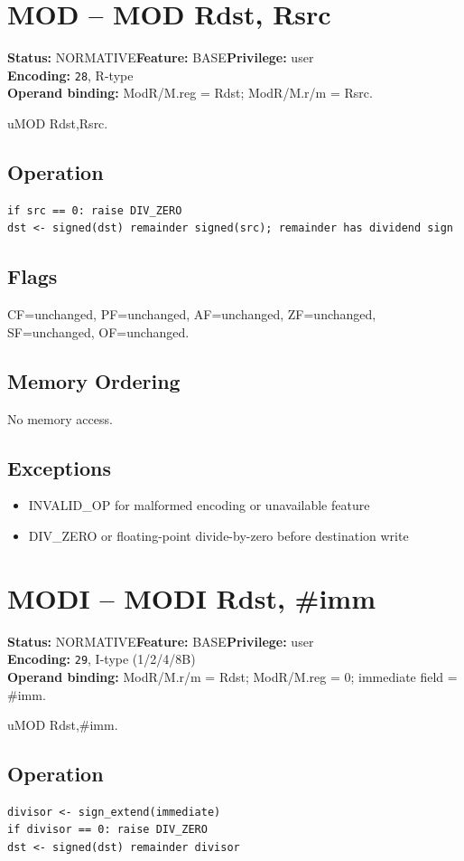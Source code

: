 \documentclass[10pt]{article}
\begin{document}
\section{MOD -- MOD Rdst, Rsrc}
\textbf{Status:} NORMATIVE\quad \textbf{Feature:} BASE\quad \textbf{Privilege:} user\\
\textbf{Encoding:} \texttt{28}, R-type\\
\textbf{Operand binding:} ModR/M.reg = Rdst; ModR/M.r/m = Rsrc.

uMOD Rdst,Rsrc.

\subsection*{Operation}
\begin{lstlisting}
if src == 0: raise DIV_ZERO
dst <- signed(dst) remainder signed(src); remainder has dividend sign
\end{lstlisting}
\subsection*{Flags}
CF=unchanged, PF=unchanged, AF=unchanged, ZF=unchanged, SF=unchanged, OF=unchanged.
\subsection*{Memory Ordering}
No memory access.
\subsection*{Exceptions}
\begin{itemize}
\item INVALID\_OP for malformed encoding or unavailable feature
\item DIV\_ZERO or floating-point divide-by-zero before destination write
\end{itemize}
\clearpage

\section{MODI -- MODI Rdst, \#imm}
\textbf{Status:} NORMATIVE\quad \textbf{Feature:} BASE\quad \textbf{Privilege:} user\\
\textbf{Encoding:} \texttt{29}, I-type (1/2/4/8B)\\
\textbf{Operand binding:} ModR/M.r/m = Rdst; ModR/M.reg = 0; immediate field = \#imm.

uMOD Rdst,\#imm.

\subsection*{Operation}
\begin{lstlisting}
divisor <- sign_extend(immediate)
if divisor == 0: raise DIV_ZERO
dst <- signed(dst) remainder divisor
\end{lstlisting}
\end{document}
